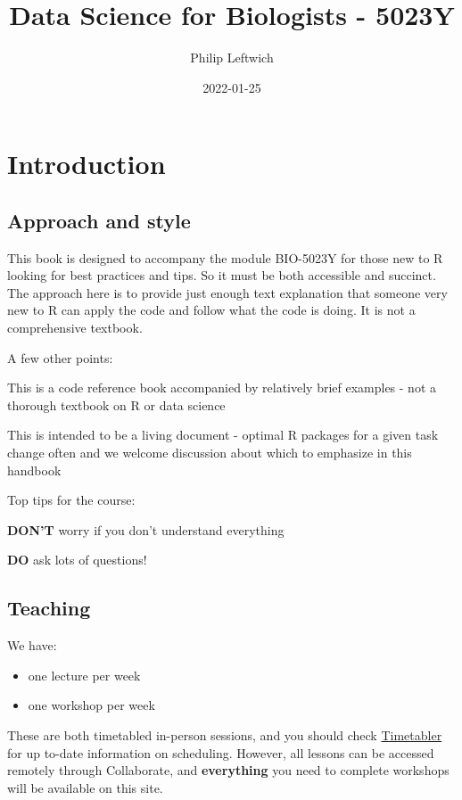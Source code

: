 \documentclass[
]{book}
\title{Data Science for Biologists - 5023Y}
\author{Philip Leftwich}
\date{2022-01-25}
\providecommand{\tightlist}{%
  \setlength{\itemsep}{0pt}\setlength{\parskip}{0pt}}
\begin{document}
\maketitle

{
\setcounter{tocdepth}{1}
\tableofcontents
}
\hypertarget{introduction}{%
\chapter{Introduction}\label{introduction}}

\hypertarget{approach-and-style}{%
\section{Approach and style}\label{approach-and-style}}

This book is designed to accompany the module BIO-5023Y for those new to R looking for best practices and tips. So it must be both accessible and succinct. The approach here is to provide just enough text explanation that someone very new to R can apply the code and follow what the code is doing. It is not a comprehensive textbook.

A few other points:

This is a code reference book accompanied by relatively brief examples - not a thorough textbook on R or data science

This is intended to be a living document - optimal R packages for a given task change often and we welcome discussion about which to emphasize in this handbook

Top tips for the course:

\textbf{DON'T} worry if you don't understand everything

\textbf{DO} ask lots of questions!

\hypertarget{teaching}{%
\section{Teaching}\label{teaching}}

We have:

\begin{itemize}
\tightlist
\item
  one lecture per week
\item
  one workshop per week
\end{itemize}

These are both timetabled in-person sessions, and you should check \href{https://timetabler.uea.ac.uk/Timetable}{Timetabler} for up to-date information on scheduling. However, all lessons can be accessed remotely through Collaborate, and \textbf{everything} you need to complete workshops will be available on this site.
\end{document}
